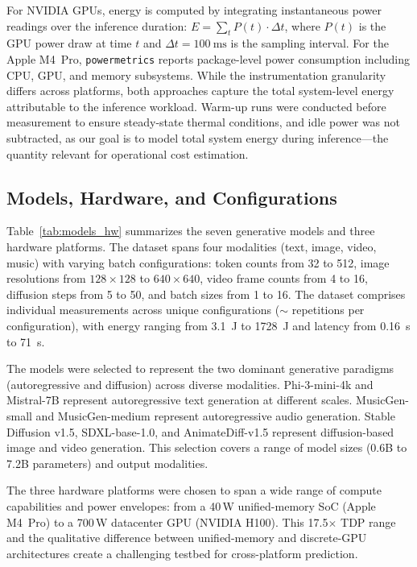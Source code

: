 \documentclass{ieeeaccess}
\begin{document}
For NVIDIA GPUs, energy is computed by integrating instantaneous power readings over the inference duration: $E = \sum_{t} P(t) \cdot \Delta t$, where $P(t)$ is the GPU power draw at time $t$ and $\Delta t = \SI{100}{\milli\second}$ is the sampling interval.
For the Apple M4~Pro, \texttt{powermetrics} reports package-level power consumption including CPU, GPU, and memory subsystems.
While the instrumentation granularity differs across platforms, both approaches capture the total system-level energy attributable to the inference workload.
Warm-up runs were conducted before measurement to ensure steady-state thermal conditions, and idle power was not subtracted, as our goal is to model total system energy during inference---the quantity relevant for operational cost estimation.

\subsection{Models, Hardware, and Configurations}
\label{sec:models_hw}
Table~\ref{tab:models_hw} summarizes the seven generative models and three hardware platforms.
The dataset spans four modalities (text, image, video, music) with varying batch configurations: token counts from 32 to 512, image resolutions from $128{\times}128$ to $640{\times}640$, video frame counts from 4 to 16, diffusion steps from 5 to 50, and batch sizes from 1 to 16.
The dataset comprises \unskip{} individual measurements across \unskip{} unique configurations (${\sim}$\unskip{} repetitions per configuration), with energy ranging from \SI{3.1}{\joule} to \SI{1728}{\joule} and latency from \SI{0.16}{\second} to \SI{71}{\second}.

The models were selected to represent the two dominant generative paradigms (autoregressive and diffusion) across diverse modalities.
Phi-3-mini-4k and Mistral-7B represent autoregressive text generation at different scales.
MusicGen-small and MusicGen-medium represent autoregressive audio generation.
Stable Diffusion v1.5, SDXL-base-1.0, and AnimateDiff-v1.5 represent diffusion-based image and video generation.
This selection covers a range of model sizes (0.6B to 7.2B parameters) and output modalities.

The three hardware platforms were chosen to span a wide range of compute capabilities and power envelopes: from a 40\,W unified-memory SoC (Apple M4~Pro) to a 700\,W datacenter GPU (NVIDIA H100).
This 17.5$\times$ TDP range and the qualitative difference between unified-memory and discrete-GPU architectures create a challenging testbed for cross-platform prediction.
\end{document}

